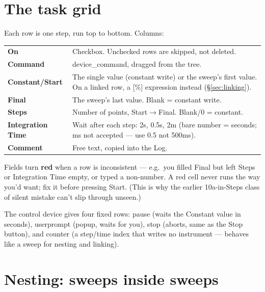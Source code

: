 \documentclass[11pt,a4paper]{article}
\newcommand{\code}[1]{{\ttfamily\color{qcode}#1}}
\begin{document}
\section{The task grid}

Each row is one step, run top to bottom. Columns:

\begin{center}\small
\begin{tabular}{@{}p{2.6cm}p{11.3cm}@{}}
\toprule
\textbf{On} & Checkbox. Unchecked rows are skipped, not deleted. \\
\textbf{Command} & \code{device\_command}, dragged from the tree. \\
\textbf{Constant/Start} & The single value (constant write) or the sweep's
  first value. On a linked row, a \code{[\%]} expression instead (\S\ref{sec:linking}). \\
\textbf{Final} & The sweep's last value. Blank = constant write. \\
\textbf{Steps} & Number of points, Start$\to$Final. Blank/\code{0} =
  constant. \\
\textbf{Integration Time} & Wait after each step: \code{2s}, \code{0.5s},
  \code{2m} (bare number = seconds; \code{ms} not accepted --- use \code{0.5}
  not \code{500ms}). \\
\textbf{Comment} & Free text, copied into the Log. \\
\bottomrule
\end{tabular}
\end{center}

\begin{tip}
Fields turn \textcolor{qwarn}{\textbf{red}} when a row is inconsistent ---
e.g.\ you filled Final but left Steps or Integration Time empty, or typed a
non-number. A red cell never runs the way you'd want; fix it before pressing
Start. (This is why the earlier \code{10a}-in-Steps class of silent mistake
can't slip through unseen.)
\end{tip}

The \code{control} device gives four fixed rows: \code{pause} (waits the
Constant value in seconds), \code{userprompt} (popup, waits for you),
\code{stop} (aborts, same as the Stop button), and \code{counter} (a
step/time index that writes no instrument --- behaves like a sweep for
nesting and linking).

\section{Nesting: sweeps inside sweeps}
\end{document}
